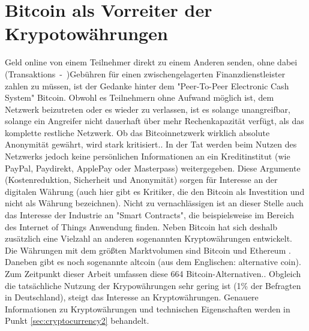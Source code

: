 \section{Bitcoin als Vorreiter der Krypotowährungen}\label{sec:cryptocurrency}
Geld online von einem Teilnehmer direkt zu einem Anderen senden, ohne dabei (Transaktions~-~)Gebühren für einen zwischengelagerten Finanzdienstleister zahlen zu müssen, ist der Gedanke hinter dem "Peer-To-Peer Electronic Cash System"\citep{nakamoto_bitcoin:_2008} Bitcoin. Obwohl es Teilnehmern ohne Aufwand möglich ist, dem Netzwerk beizutreten oder es wieder zu verlassen, ist es solange unangreifbar, solange ein Angreifer nicht dauerhaft über mehr Rechenkapazität verfügt, als das komplette restliche Netzwerk.\citep{nakamoto_bitcoin:_2008} Ob das Bitcoinnetzwerk wirklich absolute Anonymität gewährt, wird stark kritisiert.\citep{reid_analysis_2013,androulaki_evaluating_2013}. In der Tat werden beim Nutzen des Netzwerks jedoch keine persönlichen Informationen an ein Kreditinstitut (wie PayPal, Paydirekt, ApplePay oder Masterpass) weitergegeben. Diese Argumente (Kostenreduktion, Sicherheit und Anonymität) sorgen für Interesse an der digitalen Währung (auch hier gibt es Kritiker, die den Bitcoin als Investition und nicht als Währung bezeichnen)\citep{baur_bitcoin:_2015}. Nicht zu vernachlässigen ist an dieser Stelle auch das Interesse der Industrie an "Smart Contracts"\citep[S.~10]{dannen_introducing_2017}, die beispielsweise im Bereich des Internet of Things Anwendung finden.\citep{christidis_blockchains_2016}\newline
Neben Bitcoin hat sich deshalb zusätzlich eine Vielzahl an anderen sogenannten Kryptowährungen entwickelt. Die Währungen mit dem größten Marktvolumen sind  Bitcoin und Ethereum \citep{wood_ethereum:_2014}.\citep{brandt_infografik:_2017, coinmarketcap_ranking_2017} Daneben gibt es noch sogenannte \gls{altcoin} (aus dem Englischen: alternative coin\citep{prableen_bajpai_altcoin_2014}). Zum Zeitpunkt dieser Arbeit umfassen diese 664 Bitcoin-Alternativen.\citep{coindesk_anzahl_2017}. Obgleich die tatsächliche Nutzung der Krypowährungen sehr gering ist (1\% der Befragten in Deutschland\citep{tsys_kennen_2016}), steigt das Interesse an Kryptowährungen\citep{wikitrends_compare_2017,googletrends_googletrends_2017}.\newline
Genauere Informationen zu Kryptowährungen und technischen Eigenschaften werden in Punkt \ref{sec:cryptocurrency2} behandelt.

